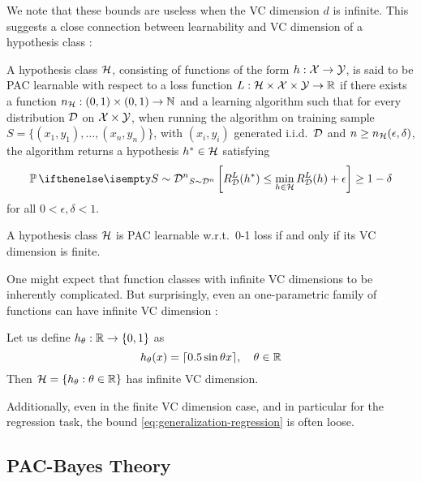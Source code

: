 We note that these bounds are useless when the VC dimension $d$ is infinite.
This suggests a close connection between learnability and VC dimension of a
hypothesis class \citep[Sections 3.2, 6.4]{shalev2014understanding}:

\begin{definition}
  A hypothesis class $\mathcal{H}$, consisting of functions of the form $h : \mathcal{X} \to
  \mathcal{Y}$, is said to be PAC learnable with respect to a loss function $L : \mathcal{H}
  \times \mathcal{X} \times \mathcal{Y} \to \mathbb{R}$ if there exists a function $n_{\mathcal{H}} : (0, 1)
  \times (0, 1) \to \mathbb{N}$ and a learning algorithm such that for every
  distribution $\mathcal{D}$ on $\mathcal{X} \times \mathcal{Y}$, when running the algorithm on training
  sample $S = \{(x_1, y_1), \ldots, (x_n, y_n)\}$, with $(x_i, y_i)$ generated
  i.i.d.\ $\mathcal{D}$ and $n \geq n_{\mathcal{H}}(\epsilon, \delta)$, the algorithm returns a
  hypothesis $h^* \in \mathcal{H}$ satisfying
  \begin{equation}
    \Pr[S \sim \CD^n]{R_\CD^L(h^*) \leq \min_{h \in \CH} R_\CD^L(h) + \epsilon}
    \geq 1 - \delta
  \end{equation}
  for all $0 < \epsilon, \delta < 1$.
\end{definition}

\begin{theorem}
  A hypothesis class $\mathcal{H}$ is PAC learnable w.r.t.\ 0-1 loss if and only if its
  VC dimension is finite.
\end{theorem}

One might expect that function classes with infinite VC dimensions to be
inherently complicated. But surprisingly, even an one-parametric family of
functions can have infinite VC dimension \citep[Section
6.3]{shalev2014understanding}:

\begin{example}
  Let us define $h_\theta : \mathbb{R} \to \{0, 1\}$ as
  \begin{equation}
    h_\theta(x) = \lceil 0.5 \sin \theta x \rceil, \quad \theta \in \mathbb{R}
  \end{equation}
  Then $\mathcal{H} = \{h_\theta : \theta \in \mathbb{R}\}$ has infinite VC dimension.
\end{example}

Additionally, even in the finite VC dimension case, and in particular for the
regression task, the bound \eqref{eq:generalization-regression} is often loose.

\subsection{PAC-Bayes Theory}

